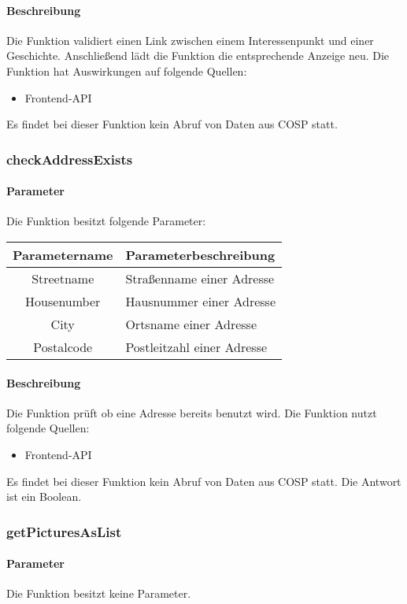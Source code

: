 \paragraph{Beschreibung} Die Funktion validiert einen Link zwischen einem Interessenpunkt und einer Geschichte. Anschließend lädt die Funktion die entsprechende Anzeige neu. Die Funktion hat Auswirkungen auf folgende Quellen:
\begin{itemize}
	\item Frontend-API
\end{itemize}
Es findet bei dieser Funktion kein Abruf von Daten aus {\glqq COSP\grqq} statt.
\subsubsection{checkAddressExists}
\paragraph{Parameter} Die Funktion besitzt folgende Parameter:
\begin{table}[H]
	\begin{tabular}{|c|p{11cm}|}
		\hline
		\textbf{Parametername} & \textbf{Parameterbeschreibung} \\ \hline
		Streetname  & Straßenname einer Adresse \\ \hline
		Housenumber & Hausnummer einer Adresse \\ \hline
		City        & Ortsname einer Adresse \\ \hline
		Postalcode  & Postleitzahl einer Adresse \\ \hline
	\end{tabular}
\end{table}
\paragraph{Beschreibung} Die Funktion prüft ob eine Adresse bereits benutzt wird. Die Funktion nutzt folgende Quellen:
\begin{itemize}
	\item Frontend-API
\end{itemize}
Es findet bei dieser Funktion kein Abruf von Daten aus {\glqq COSP\grqq} statt. Die Antwort ist ein Boolean.
\subsubsection{getPicturesAsList}
\paragraph{Parameter} Die Funktion besitzt keine Parameter.
